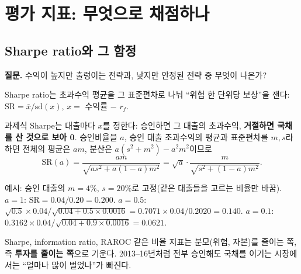 \chapter{평가 지표: 무엇으로 채점하나}

\section{Sharpe ratio와 그 함정}
\textbf{질문.} 수익이 높지만 출렁이는 전략과, 낮지만 안정된 전략 중 무엇이 나은가?

Sharpe ratio는 초과수익 평균을 그 표준편차로 나눠 ``위험 한 단위당 보상''을 잰다: $\mathrm{SR}=\bar x/\mathrm{sd}(x)$, $x=$ 수익률 $-$ $r_f$.

과제식 Sharpe는 대출마다 $x$를 정한다: 승인하면 그 대출의 초과수익, \textbf{거절하면 국채를 산 것으로 보아 0}. 승인비율을 $a$, 승인 대출 초과수익의 평균과 표준편차를 $m,s$라 하면 전체의 평균은 $am$, 분산은 $a(s^2+m^2)-a^2m^2$이므로
\[
\mathrm{SR}(a)=\frac{am}{\sqrt{a s^2+a(1-a)m^2}}=\sqrt{a}\cdot\frac{m}{\sqrt{s^2+(1-a)m^2}} .
\]

\begin{workout}
 예시: 승인 대출의 $m=4\%$, $s=20\%$로 고정(같은 대출들을 고르는 비율만 바꿈).
 $a=1$: $\mathrm{SR}=0.04/0.20=0.200$.
 $a=0.5$: $\sqrt{0.5}\times0.04/\sqrt{0.04+0.5\times0.0016}=0.7071\times0.04/0.2020=0.140$.
 $a=0.1$: $0.3162\times0.04/\sqrt{0.04+0.9\times0.0016}=0.0621$.
\end{workout}

\begin{keybox}[비율 지표의 공통 문제(C11)]
Sharpe, information ratio, RAROC 같은 비율 지표는 분모(위험, 자본)를 줄이는 쪽, 즉 \textbf{투자를 줄이는 쪽}으로 기운다. 2013--16년처럼 전부 승인해도 국채를 이기는 시장에서는 ``얼마나 많이 벌었나''가 빠진다.
\end{keybox}

